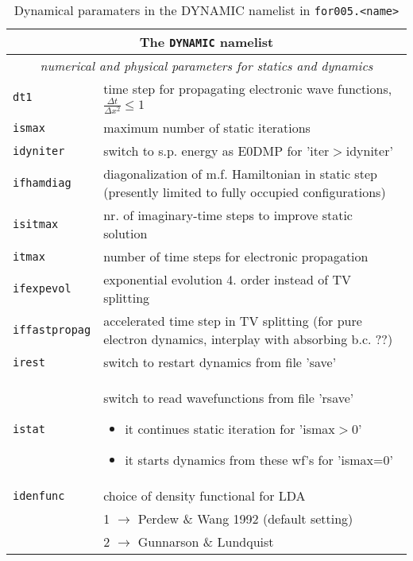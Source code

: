 \documentclass[11pt,a4paper]{article}
\begin{document}
			\begin{table}[!htbp]
				\caption{Dynamical paramaters in the DYNAMIC namelist in \texttt{for005.<name>}}\label{tab:dyn-input-params-general}
				\begin{tabular}{|p{3.5cm}|p{11.2cm}|}
					\hline
					\multicolumn{2}{|c|}{The \texttt{DYNAMIC} namelist}\\
					\hline
					\multicolumn{2}{|c|}{\textit{\color{activeColor}numerical and physical parameters for statics and dynamics}} \\
					\hline
					\texttt{dt1}& time step for propagating electronic wave functions,  $\frac{\Delta t}{\Delta x^{2}}\leq 1$\\
					\hline
					\texttt{ismax}& maximum number of static iterations \\
					\hline
					\texttt{idyniter}& switch to s.p. energy as E0DMP for 'iter$>$idyniter'\\
					\hline
					\texttt{ifhamdiag} & diagonalization of m.f. Hamiltonian in static step (presently limited to fully occupied configurations)\\
					\texttt{isitmax}& nr. of imaginary-time steps to improve static solution\\
					\hline
					\texttt{itmax}& number of time steps for electronic propagation\\
					\hline
					\texttt{ifexpevol} & exponential evolution 4. order instead of TV splitting\\
					\hline
					\texttt{iffastpropag} & accelerated time step in TV splitting (for pure electron dynamics, interplay with absorbing b.c. ??)\\
					\hline
					\texttt{irest}& switch to restart dynamics from file 'save'\\
					\hline
					\texttt{istat}& switch to read wavefunctions from file 'rsave'
					\begin{itemize}
						\item it continues static iteration for 'ismax$>$0'
						\item it starts dynamics from these wf's for 'ismax=0'
						\vspace{-3ex}
					\end{itemize}\\
					\hline
					\texttt{idenfunc} & choice of density functional for LDA\\
						& 1 $\rightarrow$ Perdew \& Wang 1992 (default setting)\\
						& 2 $\rightarrow$ Gunnarson \& Lundquist\\

\end{tabular}
\end{table}
\end{document}
